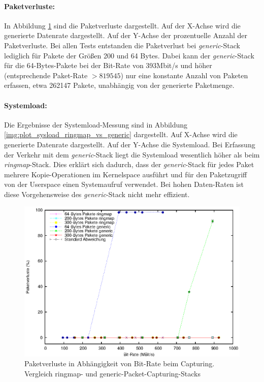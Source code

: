 \paragraph*{Paketverluste:}
In Abbildung \ref{img:plot_pktlos_ringmap_vs_generic_mbs} sind die
Paketverluste dargestellt.  Auf der X-Achse wird die generierte Datenrate
dargestellt. Auf der Y-Achse der prozentuelle Anzahl der Paketverluste.  Bei
allen Tests entstanden die Paketverlust bei \emph{generic}-Stack lediglich für
Pakete der Größen 200 und 64 Bytes.  Dabei kann der \emph{generic}-Stack für
die 64-Bytes-Pakete bei der Bit-Rate von 393Mbit/s und höher
(entsprechende Paket-Rate $> 819545$) nur eine konstante Anzahl von Paketen
erfassen, etwa 262147 Pakete, unabhängig von der generierte Paketmenge. 

\paragraph*{Systemload:}
Die Ergebnisse der Systemload-Messung sind in Abbildung
\ref{img:plot_sysload_ringmap_vs_generic} dargestellt. Auf X-Achse wird die
generierte Datenrate dargestellt. Auf der Y-Achse die Systemload.  Bei
Erfassung der Verkehr mit dem \emph{generic}-Stack liegt die Systemload
wesentlich höher als beim \emph{ringmap}-Stack. Dies erklärt sich dadurch, dass
der \emph{generic}-Stack für jedes Paket mehrere Kopie-Operationen im
Kernelspace ausführt und für den Paketzugriff von der Userspace einen
Systemaufruf verwendet. Bei hohen Daten-Raten ist diese Vorgehensweise des
\emph{generic}-Stack nicht mehr effizient.
\begin{figure} 
\centering \includegraphics[width=5.5in]{plots/graphs/pktloss_generic_vs_ringmap_mbs.eps}
\caption{Paketverluste in Abhängigkeit von Bit-Rate beim Capturing. Vergleich ringmap- und generic-Packet-Capturing-Stacks}
\label{img:plot_pktlos_ringmap_vs_generic_mbs}
\end{figure}
